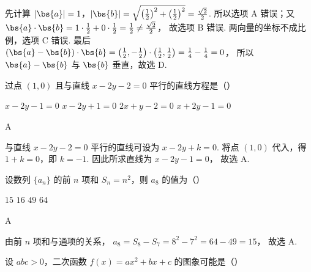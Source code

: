 \begin{solution}
先计算
 \(|\bs{a}|=1\)，\(|\bs{b}|=\sqrt{\left(\frac12\right)^2+\left(\frac12\right)^2}=\frac{\sqrt2}{2}\).
所以选项 A 错误；又
\(\bs{a}\cdot\bs{b}=1\cdot\frac12+0\cdot\frac12=\frac12\ne\frac{\sqrt2}{2}\)，
故选项 B 错误. 两向量的坐标不成比例，选项 C 错误. 最后
\((\bs{a}-\bs{b})\cdot\bs{b}=\left(\frac12,-\frac12\right)\cdot\left(\frac12,\frac12\right)=\frac14-\frac14=0\)，
所以 \(\bs{a}-\bs{b}\) 与 \(\bs{b}\) 垂直，故选 D.
\end{solution}

\begin{problem}
过点 \((1,0)\) 且与直线 \(x - 2y - 2 = 0\) 平行的直线方程是（\quad）

\choices
    {\(x - 2y - 1 = 0\)}
    {\(x - 2y + 1 = 0\)}
    {\(2x + y - 2 = 0\)}
    {\(x + 2y - 1 = 0\)}
\end{problem}

\begin{answer}
A
\end{answer}

\begin{solution}
与直线 \(x-2y-2=0\) 平行的直线可设为
\(x-2y+k=0\). 将点 \((1,0)\) 代入，得 \(1+k=0\)，即 \(k=-1\). 因此所求直线为 \(x-2y-1=0\)，
故选 A.
\end{solution}

\begin{problem}
设数列 \(\{a_{n}\}\) 的前 \(n\) 项和 \(S_{n} = n^{2}\)，则 \(a_{8}\) 的值为（\quad）

\choices
    {\(15\)}
    {\(16\)}
    {\(49\)}
    {\(64\)}
\end{problem}

\begin{answer}
A
\end{answer}

\begin{solution}
由前 \(n\) 项和与通项的关系，
\(a_8=S_8-S_7=8^2-7^2=64-49=15\)，
故选 A.
\end{solution}

\begin{problem}
设 \( abc > 0 \)，二次函数 \( f(x) = ax^2 + bx + c \) 的图象可能是（\quad）

    {}
    {}
    {}
\end{problem}

